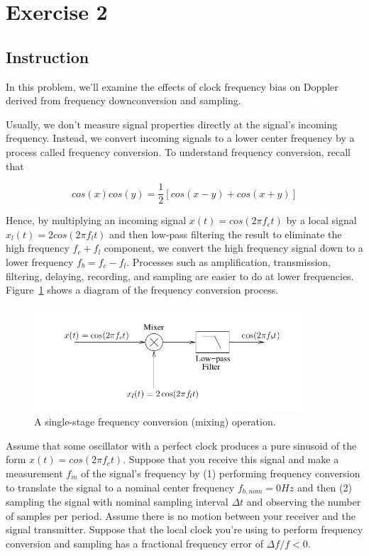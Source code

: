 \section{Exercise 2}

\subsection{Instruction}

In this problem, we’ll examine the effects of clock frequency bias on Doppler
derived from frequency downconversion and sampling.

Usually, we don’t measure signal properties directly at the signal’s incoming
frequency. Instead, we convert incoming signals to a lower center frequency by a
process called frequency conversion. To understand frequency conversion, recall
that

\begin{equation}
	cos(x) cos(y) = \frac{1}{2} [cos(x − y) + cos(x + y)]
\end{equation}

Hence, by multiplying an incoming signal $x(t) = cos(2 \pi f_c t)$ by a local
signal $x_l(t) = 2 cos(2 \pi f_l t)$ and then low-pass filtering the result to
eliminate the high frequency $f_c + f_l$ component, we convert the high frequency
signal down to a lower frequency $f_b = f_c − f_l$. Processes such as
amplification, transmission, filtering, delaying, recording, and sampling are
easier to do at lower frequencies. Figure~\ref{fig:ex2_diagram} shows a diagram
of the frequency conversion process.

\begin{figure}[H]
	\centering
	\includegraphics[width=0.9\textwidth]{figs/ex2_diagram.png}
	\caption{A single-stage frequency conversion (mixing) operation.}
	\label{fig:ex2_diagram}
\end{figure}

Assume that some oscillator with a perfect clock produces a pure sinusoid of the
form $x(t) = cos(2 \pi f_c t)$. Suppose that you receive this signal and make a
measurement $f_m$ of the signal’s frequency by (1) performing frequency
conversion to translate the signal to a nominal center frequency $f_{b,nom} = 0 Hz$
and then (2) sampling the signal with nominal sampling interval $\Delta t$ and
observing the number of samples per period. Assume there is no motion between
your receiver and the signal transmitter. Suppose that the local clock you’re
using to perform frequency conversion and sampling has a fractional frequency
error of $\Delta f /f < 0$.

